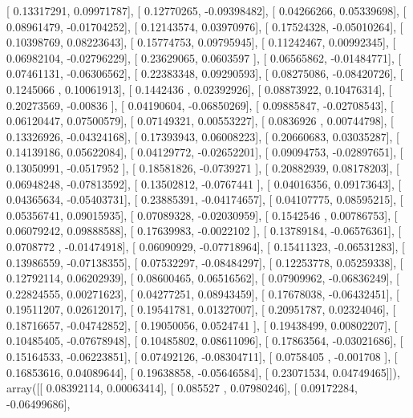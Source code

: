 \documentclass{article}
\begin{document}
       [ 0.13317291,  0.09971787],
       [ 0.12770265, -0.09398482],
       [ 0.04266266,  0.05339698],
       [ 0.08961479, -0.01704252],
       [ 0.12143574,  0.03970976],
       [ 0.17524328, -0.05010264],
       [ 0.10398769,  0.08223643],
       [ 0.15774753,  0.09795945],
       [ 0.11242467,  0.00992345],
       [ 0.06982104, -0.02796229],
       [ 0.23629065,  0.0603597 ],
       [ 0.06565862, -0.01484771],
       [ 0.07461131, -0.06306562],
       [ 0.22383348,  0.09290593],
       [ 0.08275086, -0.08420726],
       [ 0.1245066 ,  0.10061913],
       [ 0.1442436 ,  0.02392926],
       [ 0.08873922,  0.10476314],
       [ 0.20273569, -0.00836   ],
       [ 0.04190604, -0.06850269],
       [ 0.09885847, -0.02708543],
       [ 0.06120447,  0.07500579],
       [ 0.07149321,  0.00553227],
       [ 0.0836926 ,  0.00744798],
       [ 0.13326926, -0.04324168],
       [ 0.17393943,  0.06008223],
       [ 0.20660683,  0.03035287],
       [ 0.14139186,  0.05622084],
       [ 0.04129772, -0.02652201],
       [ 0.09094753, -0.02897651],
       [ 0.13050991, -0.0517952 ],
       [ 0.18581826, -0.0739271 ],
       [ 0.20882939,  0.08178203],
       [ 0.06948248, -0.07813592],
       [ 0.13502812, -0.0767441 ],
       [ 0.04016356,  0.09173643],
       [ 0.04365634, -0.05403731],
       [ 0.23885391, -0.04174657],
       [ 0.04107775,  0.08595215],
       [ 0.05356741,  0.09015935],
       [ 0.07089328, -0.02030959],
       [ 0.1542546 ,  0.00786753],
       [ 0.06079242,  0.09888588],
       [ 0.17639983, -0.0022102 ],
       [ 0.13789184, -0.06576361],
       [ 0.0708772 , -0.01474918],
       [ 0.06090929, -0.07718964],
       [ 0.15411323, -0.06531283],
       [ 0.13986559, -0.07138355],
       [ 0.07532297, -0.08484297],
       [ 0.12253778,  0.05259338],
       [ 0.12792114,  0.06202939],
       [ 0.08600465,  0.06516562],
       [ 0.07909962, -0.06836249],
       [ 0.22824555,  0.00271623],
       [ 0.04277251,  0.08943459],
       [ 0.17678038, -0.06432451],
       [ 0.19511207,  0.02612017],
       [ 0.19541781,  0.01327007],
       [ 0.20951787,  0.02324046],
       [ 0.18716657, -0.04742852],
       [ 0.19050056,  0.0524741 ],
       [ 0.19438499,  0.00802207],
       [ 0.10485405, -0.07678948],
       [ 0.10485802,  0.08611096],
       [ 0.17863564, -0.03021686],
       [ 0.15164533, -0.06223851],
       [ 0.07492126, -0.08304711],
       [ 0.0758405 , -0.001708  ],
       [ 0.16853616,  0.04089644],
       [ 0.19638858, -0.05646584],
       [ 0.23071534,  0.04749465]]), array([[ 0.08392114,  0.00063414],
       [ 0.085527  ,  0.07980246],
       [ 0.09172284, -0.06499686],
\end{document}
